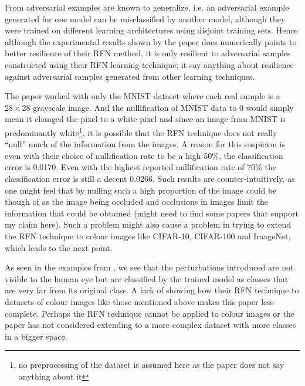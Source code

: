 \documentclass[a4paper,10pt]{article}
\theoremstyle{definition}
\begin{document}
From \cite{goodfellow2014explaining} adversarial examples are known to generalize, i.e. an adversarial example generated for one model can be misclassified by another model, although they were trained on different learning architectures using disjoint training sets. Hence although the experimental results shown by the paper does numerically points to better resilience of their RFN method, it is only resilient to adversarial samples constructed using their RFN learning technique; it say anything about resilience against adversarial samples generated from other learning techniques. 


The paper worked with only the MNIST dataset where each real sample is a $28 \times  28$ grayscale image. And the nullification of MNIST data to 0 would simply mean it changed the pixel to a white pixel and since an image from MNIST is predominantly white\footnote{no preprocessing of the dataset is assumed here as the paper does not say anything about it}, it is possible that the RFN technique does not really ``null'' much of the information from the images. A reason for this suspicion is even with their choice of nullification rate to be a high $50\%$, the classification error is 0.0170. Even with the highest reported nullification rate of $70\%$ the classification error is still  a decent 0.0266. Such results are counter-intuitively, as one might feel that by nulling such a high proportion of the image could be though of as the image being occluded and occlusions in images limit the information that could be obtained (might need to find some papers that support my claim here). Such a problem might also cause a problem in trying to extend the RFN technique to colour images like CIFAR-10, CIFAR-100 and ImageNet, which leads to the next point.

As seen in the examples from \cite{szegedy2013intriguing}, we see that the perturbations introduced are not visible to the human eye but are classified by the trained model as classes that are very far from its original class. A lack of showing how their RFN technique to datasets of colour images like those mentioned above makes this paper less complete. Perhaps the RFN technique cannot be applied to colour images or the paper has not considered extending to a more complex dataset with more classes in a bigger space. 


%
\end{document}
